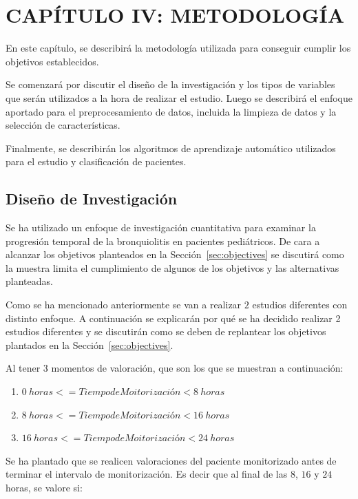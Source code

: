 \section{CAPÍTULO IV: METODOLOGÍA}\label{sec:methodology}

En este capítulo, se describirá la metodología utilizada para conseguir cumplir los objetivos establecidos. 

Se comenzará por discutir el diseño de la investigación y los tipos de variables que serán utilizados a la hora de realizar el estudio. Luego se describirá el enfoque aportado para el preprocesamiento de datos, incluida la limpieza de datos y la selección de características.

Finalmente, se describirán los algoritmos de aprendizaje automático utilizados para el estudio y clasificación de pacientes. 

\subsection{Diseño de Investigación}

Se ha utilizado un enfoque de investigación cuantitativa para examinar la progresión temporal de la bronquiolitis en pacientes pediátricos. De cara a alcanzar los objetivos planteados en la Sección~\ref{sec:objectives} se discutirá como la muestra limita el cumplimiento de algunos de los objetivos y las alternativas planteadas. 

Como se ha mencionado anteriormente se van a realizar $2$ estudios diferentes con distinto enfoque. A continuación se explicarán por qué se ha decidido realizar 2 estudios diferentes y se discutirán como se deben de replantear los objetivos plantados en la Sección~\ref{sec:objectives}.

Al tener 3 momentos de valoración, que son los que se muestran a continuación:

\begin{enumerate}
    \item $0\:horas <= Tiempo de Moitorización < 8\:horas$ 
    \item $8\:horas <= Tiempo de Moitorización < 16\:horas$
    \item $16\:horas <= Tiempo de Moitorización < 24\:horas$
\end{enumerate}

Se ha plantado que se realicen valoraciones del paciente monitorizado antes de terminar el intervalo de monitorización. Es decir que al final de las $8$, $16$ y $24$ horas, se valore si: 

